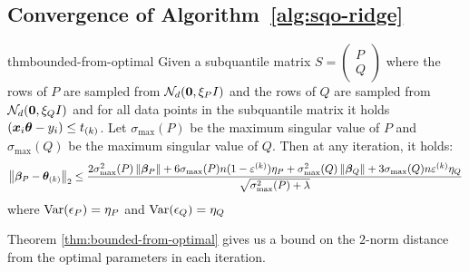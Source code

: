 \documentclass{article} %
\newcommand{\norm}[1]{\left\lVert#1\right\rVert}
\begin{document}
	\subsection{Convergence of Algorithm~\ref{alg:sqo-ridge}}
	\begin{restatable}{thm}{bounded-from-optimal}\label{thm:bounded-from-optimal}
		Given a subquantile matrix $S = \begin{pmatrix}P \\Q \end{pmatrix}$ where the rows of $P$ are sampled from $\mathcal{N}_d({\bm{0}}, \xi_P I)$ and the rows of $Q$ are sampled from $\mathcal{N}_d({\bm{0}}, \xi_Q I)$ and for all data points in the subquantile matrix it holds $({\bm{x}}_i{\bm{\theta}} - y_i) \leq t_{(k)}$. Let $\sigma_{\max}(P)$ be the maximum singular value of $P$ and $\sigma_{\max}(Q)$ be the maximum singular value of $Q$. Then at any iteration, it holds: 
		\begin{equation*}
			\displaystyle \norm{\vbeta_P - \vtheta_{(k)}}_2 \leq \frac{2\sigma^2_{\max}(P)\norm{\vbeta_P} + 6\sigma_{\max}(P)n(1-\varepsilon^{(k)})\eta_P + \sigma^2_{\max}(Q)\norm{\vbeta_Q} + 3\sigma_{\max}(Q)n\varepsilon^{(k)}\eta_Q}{\sqrt{\sigma^2_{\max}(P) + \lambda}}
		\end{equation*}
		where $\mathrm{Var}({\epsilon}_P) = \eta_P$ and $\mathrm{Var}({\epsilon}_Q) = \eta_Q$
	\end{restatable}

	Theorem \ref{thm:bounded-from-optimal} gives us a bound on the $2$-norm distance from the optimal parameters in each iteration.
	
\end{document}
